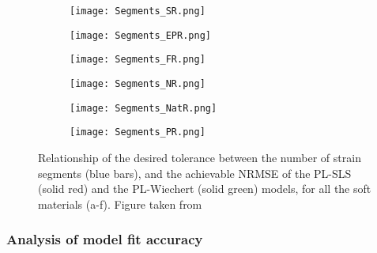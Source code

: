 \begin{figure}[htb!]
    \centering
    \begin{subfigure}[b]{0.49\textwidth}
        \centering
        \texttt{[image: Segments\_SR.png]}
        \caption{}
        \label{fig:SegmentsSR}
    \end{subfigure}
    \begin{subfigure}[b]{0.49\textwidth}
        \centering
        \texttt{[image: Segments\_EPR.png]}
        \caption{}
        \label{fig:SegmentsEPR}
    \end{subfigure}
    \begin{subfigure}[b]{0.49\textwidth}
        \centering
        \texttt{[image: Segments\_FR.png]}
        \caption{}
        \label{fig:SegmentsFR}
    \end{subfigure}
    \begin{subfigure}[b]{0.49\textwidth}
        \centering
        \texttt{[image: Segments\_NR.png]}
        \caption{}
        \label{fig:SegmentsNR}
    \end{subfigure}
    \begin{subfigure}[b]{0.49\textwidth}
        \centering
        \texttt{[image: Segments\_NatR.png]}
        \caption{}
        \label{fig:SegmentsNatR}
    \end{subfigure}
    \begin{subfigure}[b]{0.49\textwidth}
        \centering
        \texttt{[image: Segments\_PR.png]}
        \caption{}
        \label{fig:SegmentsPR}
    \end{subfigure}
    \caption{Relationship of the desired tolerance between the number of strain segments (blue bars), and the achievable NRMSE of the PL-SLS (solid red) and the PL-Wiechert (solid green) models, for all the soft materials (a-f). Figure taken from \cite{solis2018assessment}}
    \label{fig:SegmentsAll}
\end{figure}

\subsubsection{Analysis of model fit accuracy} \label{ModelfitAnalysis}

